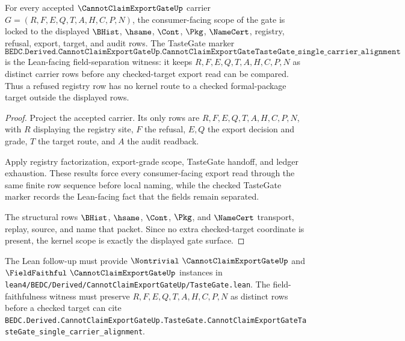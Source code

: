 \begin{theorem}
\label{thm:cannot-claim-export-gate-kernel-scope-lock}
For every accepted $\CannotClaimExportGateUp$ carrier $G=(R,F,E,Q,T,A,H,C,P,N)$, the consumer-facing scope of the gate is locked to the displayed $\BHist$, $\hsame$, $\Cont$, $\Pkg$, $\NameCert$, registry, refusal, export, target, and audit rows. The TasteGate marker
$$
\texttt{BEDC.Derived.CannotClaimExportGateUp.CannotClaimExportGateTasteGate\_single\_carrier\_alignment}
$$
is the Lean-facing field-separation witness: it keeps $R,F,E,Q,T,A,H,C,P,N$ as distinct carrier rows before any checked-target export read can be compared. Thus a refused registry row has no kernel route to a checked formal-package target outside the displayed rows.
\end{theorem}
\begin{proof}
Project the accepted carrier. Its only rows are $R,F,E,Q,T,A,H,C,P,N$, with $R$ displaying the registry site, $F$ the refusal, $E,Q$ the export decision and grade, $T$ the target route, and $A$ the audit readback.

Apply registry factorization, export-grade scope, TasteGate handoff, and ledger exhaustion. These results force every consumer-facing export read through the same finite row sequence before local naming, while the checked TasteGate marker records the Lean-facing fact that the fields remain separated.

The structural rows $\BHist$, $\hsame$, $\Cont$, $\Pkg$, and $\NameCert$ transport, replay, source, and name that packet. Since no extra checked-target coordinate is present, the kernel scope is exactly the displayed gate surface.
\end{proof}



The Lean follow-up must provide $\Nontrivial\ \CannotClaimExportGateUp$ and $\FieldFaithful\ \CannotClaimExportGateUp$ instances in \texttt{lean4/BEDC/Derived/CannotClaimExportGateUp/TasteGate.lean}. The field-faithfulness witness must preserve $R,F,E,Q,T,A,H,C,P,N$ as distinct rows before a checked target can cite \texttt{BEDC.Derived.CannotClaimExportGateUp.TasteGate.CannotClaimExportGateTasteGate\_single\_carrier\_alignment}.

